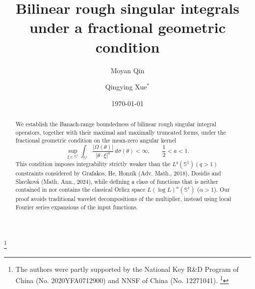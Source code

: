 \documentclass[11pt]{amsart}
\begin{document}
\author[M. Qin]{Moyan Qin}
\address{Moyan Qin:
	School of Mathematical Sciences \\
	Beijing Normal University \\
	Laboratory of Mathematics and Complex Systems \\
	Ministry of Education \\
	Beijing 100875 \\
	People's Republic of China}

\author[Q. Xue]{Qingying Xue$^{*}$}
\address{Qingying Xue:
	School of Mathematical Sciences \\
	Beijing Normal University \\
	Laboratory of Mathematics and Complex Systems \\
	Ministry of Education \\
	Beijing 100875 \\
	People's Republic of China}


\thanks{The authors were partly supported by the National Key R\&D Program of China (No. 2020YFA0712900) and NNSF of China (No. 12271041).
\thanks{$^{*}$ Corresponding author, e-mail address: qyxue@bnu.edu.cn}}

\date{\today}
\title[BILINEAR ROUGH SINGULAR INTEGRALS UNDER A FRACTIONAL GEOMETRIC CONDITION]
{\bf Bilinear rough singular integrals under a fractional geometric condition}


\begin{abstract}
	
		We establish the Banach-range boundedness of bilinear rough singular integral operators, together with their maximal and maximally truncated forms, under the fractional geometric condition on the mean-zero angular kernel
		\[
		\sup_{\xi \in \mathbb{S}^{1}}\int_{\mathbb{S}^{1}} \frac{|\Omega(\theta)|}{|\theta \cdot \xi|^{a}} \, d\sigma(\theta) < \infty, \qquad \frac12 < a < 1.
		\]
		This condition imposes integrability strictly weaker than the $L^q(\mathbb{S}^1) (q>1)$  constraints considered by Grafakos, He, Honz\'ik (Adv. Math., 2018), Dosidis and Slavíková (Math. Ann., 2024), while defining a class of functions that is neither contained in nor contains the classical Orlicz space $L(\log L)^\alpha(\mathbb{S}^1) $ ($\alpha>1$). Our proof avoids traditional wavelet decompositions of the multiplier, instead using local Fourier series expansions of the input functions. 


\end{abstract}\maketitle
\end{document}

